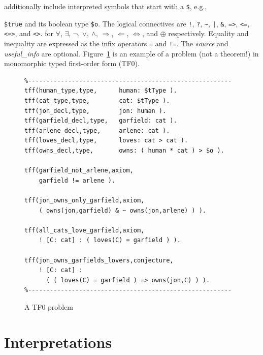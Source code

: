 \documentclass[letterpaper]{article}
\newcommand{\smalltt}[1]{\small \texttt{#1}}
\begin{document}
additionally include interpreted symbols that start with a {\tt \$}, e.g., {\smalltt{\$true} and
its boolean type {\smalltt{\$o}}.
The logical connectives are
{\tt !}, {\tt ?}, {\tt \verb|~|}, {\tt |}, {\tt \&}, {\tt =>}, {\tt <=}, {\tt <=>}, and 
{\tt <{\raisebox{0.4ex}{\texttildelow}}>}.
for
$\forall$, $\exists$, $\neg$, $\vee$, $\wedge$, $\Rightarrow$, $\Leftarrow$, $\Leftrightarrow$, 
and $\oplus$ respectively.
Equality and inequality are expressed as the infix operators {\tt =} and {\tt !=}.
The {\em source} and {\em useful\_info} are optional.
Figure~\ref{TF0FiniteProblem} is an example of a problem (not a theorem!) in monomorphic 
typed first-order form (TF0).  

\begin{figure}[htbp]
\scriptsize
{}
\begin{verbatim}
%--------------------------------------------------------
tff(human_type,type,      human: $tType ).
tff(cat_type,type,        cat: $tType ).
tff(jon_decl,type,        jon: human ).
tff(garfield_decl,type,   garfield: cat ).
tff(arlene_decl,type,     arlene: cat ).
tff(loves_decl,type,      loves: cat > cat ).
tff(owns_decl,type,       owns: ( human * cat ) > $o ).

tff(garfield_not_arlene,axiom,
    garfield != arlene ).

tff(jon_owns_only_garfield,axiom,
    ( owns(jon,garfield) & ~ owns(jon,arlene) ) ).

tff(all_cats_love_garfield,axiom,
    ! [C: cat] : ( loves(C) = garfield ) ).

tff(jon_owns_garfields_lovers,conjecture,
    ! [C: cat] : 
      ( ( loves(C) = garfield ) => owns(jon,C) ) ).
%--------------------------------------------------------
\end{verbatim}
\caption{A TF0 problem
}
\label{TF0FiniteProblem}
\end{figure}

\section{Interpretations}
\label{Interpretations}

}
\end{document}
